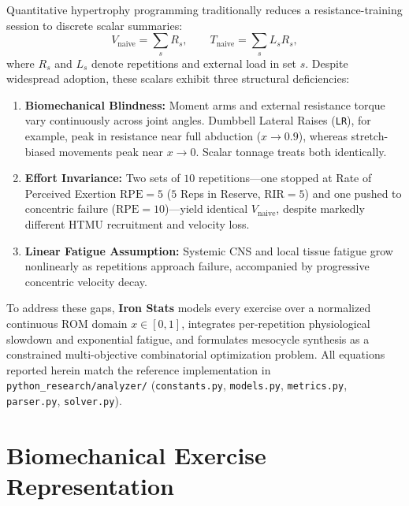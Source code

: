 \documentclass[10pt,twocolumn,letterpaper]{article}
\theoremstyle{plain}
\theoremstyle{definition}
\begin{document}
Quantitative hypertrophy programming traditionally reduces a resistance-training session to discrete scalar summaries:
\begin{equation}
  V_{\mathrm{naive}} = \sum_{s} R_s, \qquad T_{\mathrm{naive}} = \sum_{s} L_s R_s,
\end{equation}
where $R_s$ and $L_s$ denote repetitions and external load in set $s$. Despite widespread adoption, these scalars exhibit three structural deficiencies:
\begin{enumerate}
  \item \textbf{Biomechanical Blindness:} Moment arms and external resistance torque vary continuously across joint angles. Dumbbell Lateral Raises (\texttt{LR}), for example, peak in resistance near full abduction ($x \to 0.9$), whereas stretch-biased movements peak near $x \to 0$. Scalar tonnage treats both identically.
  \item \textbf{Effort Invariance:} Two sets of $10$ repetitions—one stopped at Rate of Perceived Exertion $\mathrm{RPE} = 5$ ($5$ Reps in Reserve, $\mathrm{RIR} = 5$) and one pushed to concentric failure ($\mathrm{RPE} = 10$)—yield identical $V_{\mathrm{naive}}$, despite markedly different HTMU recruitment and velocity loss.
  \item \textbf{Linear Fatigue Assumption:} Systemic CNS and local tissue fatigue grow nonlinearly as repetitions approach failure, accompanied by progressive concentric velocity decay.
\end{enumerate}

To address these gaps, \textbf{Iron Stats} models every exercise over a normalized continuous ROM domain $x \in [0, 1]$, integrates per-repetition physiological slowdown and exponential fatigue, and formulates mesocycle synthesis as a constrained multi-objective combinatorial optimization problem. All equations reported herein match the reference implementation in \texttt{python\_research/analyzer/} (\texttt{constants.py}, \texttt{models.py}, \texttt{metrics.py}, \texttt{parser.py}, \texttt{solver.py}).

\section{Biomechanical Exercise Representation}
\label{sec:models}
\end{document}
